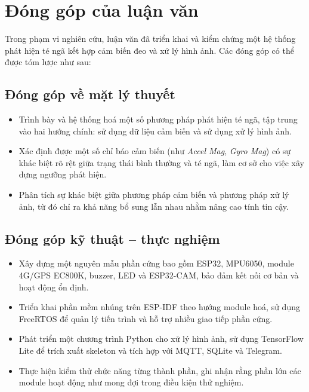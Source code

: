 
\section{Đóng góp của luận văn}
\label{sec:contribution}

Trong phạm vi nghiên cứu, luận văn đã triển khai và kiểm chứng một hệ thống phát hiện té ngã kết hợp cảm biến đeo và xử lý hình ảnh. Các đóng góp có thể được tóm lược như sau:

\subsection*{Đóng góp về mặt lý thuyết}
\begin{itemize}
    \item Trình bày và hệ thống hoá một số phương pháp phát hiện té ngã, tập trung vào hai hướng chính: sử dụng dữ liệu cảm biến và sử dụng xử lý hình ảnh.
    \item Xác định được một số chỉ báo cảm biến (như \textit{Accel Mag}, \textit{Gyro Mag}) có sự khác biệt rõ rệt giữa trạng thái bình thường và té ngã, làm cơ sở cho việc xây dựng ngưỡng phát hiện.
    \item Phân tích sự khác biệt giữa phương pháp cảm biến và phương pháp xử lý ảnh, từ đó chỉ ra khả năng bổ sung lẫn nhau nhằm nâng cao tính tin cậy.
\end{itemize}

\subsection*{Đóng góp kỹ thuật – thực nghiệm}
\begin{itemize}
    \item Xây dựng một nguyên mẫu phần cứng bao gồm ESP32, MPU6050, module 4G/GPS EC800K, buzzer, LED và ESP32-CAM, bảo đảm kết nối cơ bản và hoạt động ổn định.
    \item Triển khai phần mềm nhúng trên ESP-IDF theo hướng module hoá, sử dụng FreeRTOS để quản lý tiến trình và hỗ trợ nhiều giao tiếp phần cứng.
    \item Phát triển một chương trình Python cho xử lý hình ảnh, sử dụng TensorFlow Lite để trích xuất skeleton và tích hợp với MQTT, SQLite và Telegram.
    \item Thực hiện kiểm thử chức năng từng thành phần, ghi nhận rằng phần lớn các module hoạt động như mong đợi trong điều kiện thử nghiệm.
\end{itemize}

